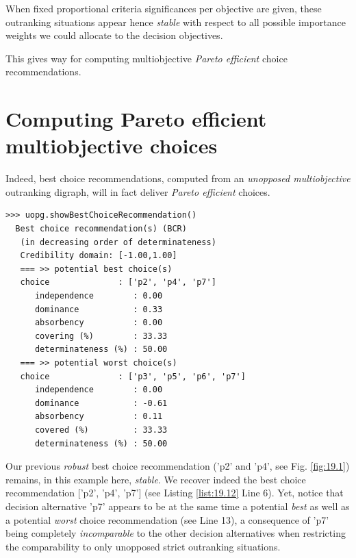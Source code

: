 When fixed proportional criteria significances per objective are given, these outranking situations appear hence \emph{stable} with respect to all possible importance weights we could allocate to the decision objectives.

This gives way for computing multiobjective \emph{Pareto efficient} choice recommendations. 

\section{Computing Pareto efficient multiobjective choices}
\label{sec:19.6}

Indeed, best choice recommendations, computed from an \emph{unopposed multiobjective} outranking digraph, will in fact deliver \emph{Pareto efficient} choices. 
\begin{lstlisting}[caption={Pareto efficient multiobjective choice},label=list:19.12]
>>> uopg.showBestChoiceRecommendation()
  Best choice recommendation(s) (BCR)
   (in decreasing order of determinateness)   
   Credibility domain: [-1.00,1.00]
   === >> potential best choice(s)
   choice              : ['p2', 'p4', 'p7']
      independence        : 0.00
      dominance           : 0.33
      absorbency          : 0.00
      covering (%)        : 33.33
      determinateness (%) : 50.00
   === >> potential worst choice(s) 
   choice              : ['p3', 'p5', 'p6', 'p7']
      independence        : 0.00
      dominance           : -0.61
      absorbency          : 0.11
      covered (%)         : 33.33
      determinateness (%) : 50.00
\end{lstlisting}

Our previous \emph{robust} best choice recommendation ('p2' and 'p4', see Fig. \ref{fig:19.1}) remains, in this example here, \emph{stable}. We recover indeed the best choice recommendation ['p2', 'p4', 'p7'] (see Listing \ref{list:19.12} Line 6). Yet, notice that decision alternative 'p7' appears to be at the same time a potential \emph{best} as well as a potential \emph{worst} choice recommendation (see Line 13), a consequence of 'p7' being completely \emph{incomparable} to the other decision alternatives when restricting the comparability to only unopposed strict outranking situations. 

